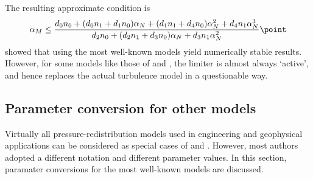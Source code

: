 The resulting approximate condition is
\begin{equation}
   \label{simpleShearCondition}
   \alpha_M \le \dfrac{d_0 n_0 + (d_0 n_1 + d_1 n_0) \alpha_N 
                          + (d_1 n_1 + d_4 n_0           ) \alpha_N^2
                          +  d_4 n_1                       \alpha_N^3}{
                             d_2 n_0 
                          + (d_2 n_1 + d_3 n_0           ) \alpha_N
                          +  d_3 n_1                       \alpha_N^2}
  \point
\end{equation}
\cite{BurchardDeleersnijder2001} showed that using 
the most well-known models yield numerically stable results. However,
for some models like those of \cite{MellorYamada82} and
\cite{KanthaClayson94}, the limiter  is
almost always `active',  and hence replaces the actual turbulence model in a
questionable way.


\subsection{Parameter conversion for other models\label{sec:parameterConversion}}
Virtually all pressure-redistribution models used in engineering and
geophysical applications can be considered as special cases of 
and . However, most authors adopted a different notation and 
different parameter values. In this section, paramater conversions for the 
most well-known models are discussed. 
